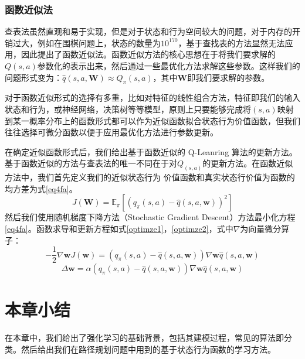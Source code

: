 \documentclass{standalone}
\begin{document}
\subsubsection{函数近似法}
查表法虽然直观和易于实现，但是对于状态和行为空间较大的问题，对于内存的开销过大，例如在围棋问题上，状态的数量为$10^{170}$，基于查找表的方法显然无法应用，因此提出了函数近似法。函数近似方法的核心思想在于将我们要求解的$Q(s, a)$参数化的表示出来，然后通过一些最优化方法求解这些参数。这样我们的问题形式变为：$\hat{q}(s, a, \mathbf{W}) \approx Q_{\pi}(s, a)$，其中$\mathbf{W}$即我们要求解的参数。\par
对于函数近似形式的选择有多重，比如对特征的线性组合方法，特征即我们的输入状态和行为，或神经网络，决策树等等模型，原则上只要能够完成将$(s, a)$映射到某一概率分布上的函数形式都可以作为近似函数拟合状态行为价值函数，但我们往往选择可微分函数以便于应用最优化方法进行参数更新。\par
在确定近似函数形式后，我们给出基于函数近似的 Q-Leanring 算法的更新方法。基于函数近似的方法与查表法的唯一不同在于对$Q_(s, a)$的更新方法。在函数近似方法中，我们首先定义我们的近似状态行为 价值函数和真实状态行价值为函数的均方差为式\ref{eq4fa}。
    \begin{equation}
    \label{eq4fa}
        J(\mathbf{W}) = \mathbb{E}_{\pi}[(q_{\pi}(s,a) - \hat{q}(s, a, \mathbf{w}))^2]
    \end{equation}
然后我们使用随机梯度下降方法（Stochastic Gradient Descent）方法最小化方程 \ref{eq4fa}。函数求导和更新方程如式\ref{optimze1}，\ref{optimze2}，式中$\nabla$为向量微分算子：
    \begin{equation}
    \label{optimze1}
        -\frac{1}{2}\nabla{\mathbf{w}}J(\mathbf{w}) = (q_{\pi}(s, a)-\hat{q}(s, a, \mathbf{w}))\nabla{\mathbf{w}} \hat{q}(s, a, \mathbf{w})
    \end{equation}
    \begin{equation}
    \label{optimze2}
        \Delta\mathbf{w} = \alpha(q_{\pi}(s, a) - \hat{q}(s, a, \mathbf{w}))\nabla{\mathbf{w}} \hat{q}(s, a, \mathbf{w})
    \end{equation}
\section{本章小结}
在本章中，我们给出了强化学习的基础背景，包括其建模过程，常见的算法即分类。然后给出我们在路径规划问题中用到的基于状态行为函数的学习方法。
\end{document}
